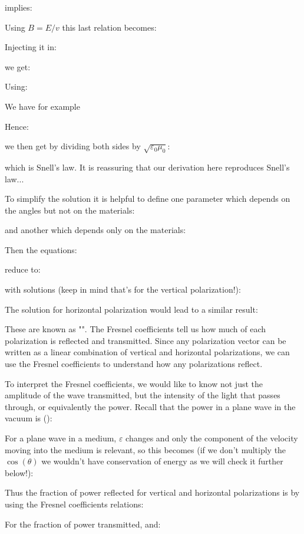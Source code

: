 	implies:
	
	Using $B=E/v$ this last relation becomes:
	
	Injecting it in:
	
	we get:
	
	Using:
	
	We have for example
	
	Hence:
	
	we then get by dividing both sides by $\sqrt{\varepsilon_{0}\mu_{0}}$:
	
	which is Snell's law. It is reassuring that our derivation here reproduces Snell's law...
	
	To simplify the solution it is helpful to define one parameter which depends on the angles but not on the materials:
	
	and another which depends only on the materials:
	
	Then the equations:
	
	reduce to:
	
	with solutions (keep in mind that's for the vertical polarization!):
	
	The solution for horizontal polarization would lead to a similar result:
	
	These are known as "\label{Fresnel coefficients}". The Fresnel coefficients tell us how much of each polarization is reflected and transmitted. Since any polarization vector can be written as a linear combination of vertical and horizontal polarizations, we can use the Fresnel coefficients to understand how any polarizations reflect.
	
	To interpret the Fresnel coefficients, we would like to know not just the amplitude of the wave transmitted, but the intensity of the light that passes through, or equivalently the power. Recall that the power in a plane wave in the vacuum is ():
	
	 For a plane wave in a medium, $\varepsilon$ changes and only the component of the velocity moving into the medium is relevant, so this becomes (if we don't multiply the $\cos(\theta)$ we wouldn't have conservation of energy as we will check it further below!):
	
	 Thus the fraction of power reflected for vertical and horizontal polarizations is by using the Fresnel coefficients relations:
	
	For the fraction of power transmitted, and:
	
